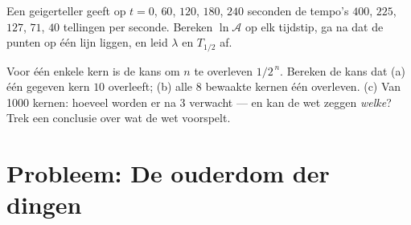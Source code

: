 \begin{exercise}[$\star\star\star$]\label{exo:g12:radioactive-decay:14}
Een geigerteller geeft op $t = 0$, $60$, $120$, $180$, $240$ seconden de
tempo's $400$, $225$, $127$, $71$, $40$ tellingen per seconde. Bereken
$\ln \mathcal A$ op elk tijdstip, ga na dat de punten op één lijn liggen, en
leid $\lambda$ en $T_{1/2}$ af.
\end{exercise}

\begin{exercise}[$\star\star\star$]\label{exo:g12:radioactive-decay:15}
Voor één enkele kern is de kans om $n$  te overleven
$1/2^{\,n}$. Bereken de kans dat (a) één gegeven kern $10$ 
overleeft; (b) alle $8$ bewaakte kernen één  overleven. (c) Van
\num{1000} kernen: hoeveel worden er na $3$  verwacht --- en
kan de wet zeggen \emph{welke}? Trek een conclusie over wat de wet voorspelt.
\end{exercise}

\section{Probleem: De ouderdom der dingen}

